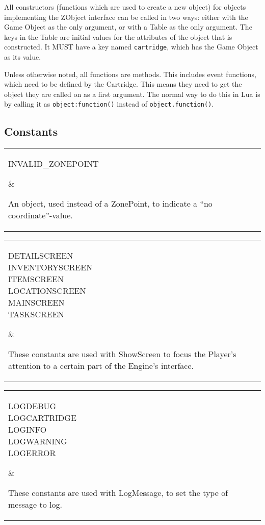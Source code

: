 \documentclass{article}
\begin{document}
All constructors (functions which are used to create a new object) for objects
implementing the ZObject interface can be called in two ways: either with the
Game Object as the only argument, or with a Table as the only argument. The
keys in the Table are initial values for the attributes of the object that is
constructed.  It MUST have a key named \verb-cartridge-, which has the Game
Object as its value.

Unless otherwise noted, all functions are methods. This includes event
functions, which need to be defined by the Cartridge.  This means they need to
get the object they are called on as a first argument. The normal way to do
this in Lua is by calling it as \verb-object:function()- instead of
\verb-object.function()-.

\newcommand\codedef[2]{\par\noindent\begin{tabular}{|l|l|}\hline\parbox{.4\textwidth}{#1}&\parbox{.5\textwidth}{#2}\\\hline\end{tabular}\par}
\newcommand\funcdef[4]{
	\par\vskip.5\baselineskip
	\par\noindent\textbf{Function:} #1 $\rightarrow$ #2\par
	\noindent\textbf{Arguments:} \parbox{.8\textwidth}{#3}\par
	\noindent\textbf{Description:} \parbox{.8\textwidth}{#4}\par
	\vskip.5\baselineskip
}
\newcommand\attrdef[3]{
	\par\vskip.5\baselineskip
	\par\noindent\textbf{Attribute:} #1 (#2)\par
	\noindent\textbf{Description:} \parbox{.8\textwidth}{#3}\par
	\vskip.5\baselineskip
}
\subsection{Constants}
\codedef{INVALID\_ZONEPOINT}{An object, used instead of a ZonePoint, to indicate a ``no coordinate''-value.}
\codedef{DETAILSCREEN\\INVENTORYSCREEN\\ITEMSCREEN\\LOCATIONSCREEN\\MAINSCREEN\\TASKSCREEN}{These constants are used with ShowScreen to focus the Player's attention to a certain part of the Engine's interface.}
\codedef{LOGDEBUG\\LOGCARTRIDGE\\LOGINFO\\LOGWARNING\\LOGERROR}{These constants are used with LogMessage, to set the type of message to log.}
\end{document}
